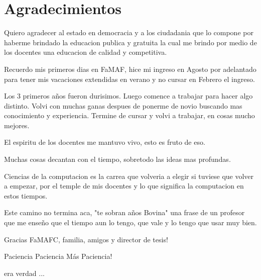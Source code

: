 \section{Agradecimientos}

Quiero agradecer al estado en democracia y a los ciudadania que lo compone por haberme
brindado la educacion publica y gratuita la cual me brindo por medio de los docentes 
una educacion de calidad y competitiva.

Recuerdo mis primeros dias en FaMAF, hice mi ingreso en Agosto por adelantado
para tener mis vacaciones extendidas en verano y no cursar en Febrero el ingreso.

Los 3 primeros años fueron durisimos. Luego comence a trabajar para hacer algo distinto.
Volvi con muchas ganas despues de ponerme de novio buscando mas conocimiento y experiencia.
Termine de cursar y volvi a trabajar, en cosas mucho mejores.

El espiritu de los docentes me mantuvo vivo, esto es fruto de eso.

Muchas cosas decantan con el tiempo, sobretodo las ideas mas profundas.

Ciencias de la computacion es la carrea que volveria a elegir si tuviese que volver 
a empezar, por el temple de mis docentes y lo que significa la computacion en estos tiempos.

Este camino no termina aca, "te sobran años Bovina" una frase de un profesor que me enseño
que el tiempo aun lo tengo, que vale y lo tengo que usar muy bien.

Gracias FaMAFC, familia, amigos y director de tesis!

Paciencia
Paciencia
Más Paciencia!

era verdad ...